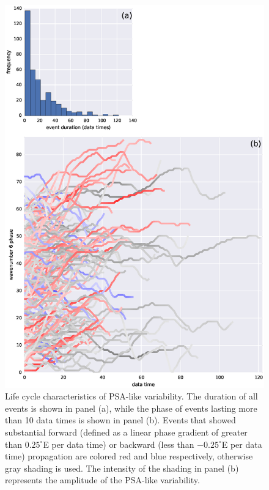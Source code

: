 \begin{figure}
\begin{center}
\includegraphics[width=0.7\columnwidth]{figures/psa/psa-event-summary_wave6-duration-gt10_ERAInterim_500hPa-lat10S10Nmean-lon115E235Ezeropad_030day-runmean-anom-wrt-all_native-np20N260E.eps}
\caption{\label{fig:lifecycle}
Life cycle characteristics of PSA-like variability. The duration of all events is shown in panel (a), while the phase of events lasting more than 10 data times is shown in panel (b). Events that showed substantial forward (defined as a linear phase gradient of greater than $0.25^{\circ}$E per data time) or backward (less than $-0.25^{\circ}$E per data time) propagation are colored red and blue respectively, otherwise gray shading is used. The intensity of the shading in panel (b) represents the amplitude of the PSA-like variability.%
}
\end{center}
\end{figure}

